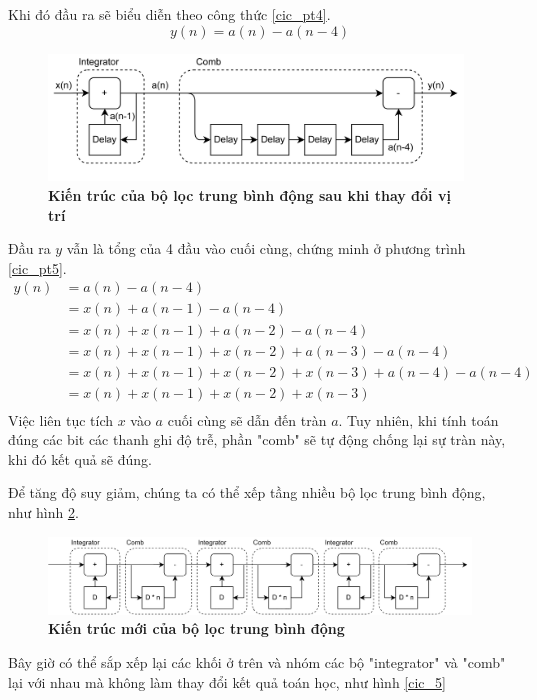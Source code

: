 Khi đó đầu ra sẽ biểu diễn theo công thức \ref{cic_pt4}.
\begin{equation} \label{cic_pt4}
    y(n) = a(n) - a(n-4)
\end{equation}

\begin{figure}[H]
    \centering
    \includegraphics[width=11cm]{Images/Chuong2/cic/cic_2.png}
    \caption[Kiến trúc của bộ lọc trung bình động sau khi thay đổi vị trí]{\bfseries \fontsize{12pt}{0pt}\selectfont Kiến trúc của bộ lọc trung bình động sau khi thay đổi vị trí}
    \label{cic_2}
\end{figure}

Đầu ra $y$ vẫn là tổng của 4 đầu vào cuối cùng, chứng minh ở phương trình \ref{cic_pt5}.
\begin{equation} \label{cic_pt5}
\begin{aligned}
    y(n) &= a(n) - a(n-4)\\
    &= x(n) + a(n-1) - a(n-4)\\
    &= x(n) + x(n-1) + a(n-2) - a(n-4)\\
    &= x(n) + x(n-1) + x(n-2) + a(n-3) - a(n-4)\\
    &= x(n) + x(n-1) + x(n-2) + x(n-3) + a(n-4) - a(n-4)\\
    &= x(n) + x(n-1) + x(n-2) + x(n-3) \\
\end{aligned}
\end{equation}
Việc liên tục tích $x$ vào $a$ cuối cùng sẽ dẫn đến tràn $a$. Tuy nhiên, khi tính toán đúng các bit các thanh ghi độ trễ, phần "comb" sẽ tự động chống lại sự tràn này, khi đó kết quả sẽ đúng.

Để tăng độ suy giảm, chúng ta có thể xếp tầng nhiều bộ lọc trung bình động, như hình \ref{cic_4}.

\begin{figure}[H]
    \centering
    \includegraphics[width=14cm]{Images/Chuong2/cic/cic_4.png}
    \caption[Kiến trúc mới của bộ lọc trung bình động]{\bfseries \fontsize{12pt}{0pt}\selectfont Kiến trúc mới của bộ lọc trung bình động}
    \label{cic_4}
\end{figure}
Bây giờ có thể sắp xếp lại các khối ở trên và nhóm các bộ "integrator"  và "comb" lại với nhau mà không làm thay đổi kết quả toán học, như hình \ref{cic_5}

